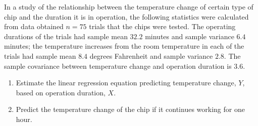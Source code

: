\item In a study of the relationship between the temperature change of certain type of chip and the duration it is in  operation, the following statistics were calculated from data obtained $n=75$ trials that the chips were tested. The operating durations of the trials had sample mean $32.2$ minutes and sample variance $6.4$ minutes; the temperature increases from the room temperature in each of the trials had sample mean $8.4$ degrees Fahrenheit and sample variance $2.8$. The sample covariance between temperature change and operation duration is $3.6$. \vspace{.2cm}
\begin{enumerate}
\item Estimate the linear regression equation predicting temperature change, $Y$, based on operation duration, $X$.
\item Predict the temperature change of the chip if it continues working for one hour. 
\end{enumerate}  

